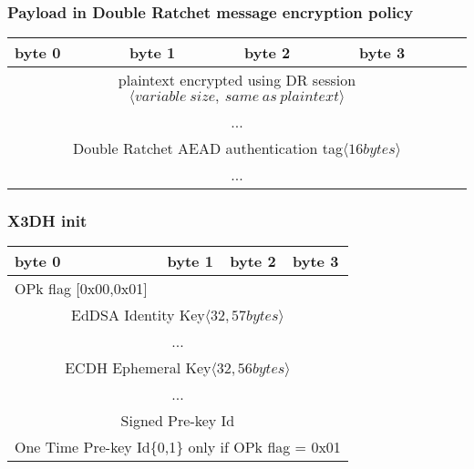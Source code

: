 \documentclass[a4paper,11pt]{article}
\begin{document}
      \subsubsection{Payload in Double Ratchet message encryption policy}
      \begin{center}
      \begin{tabular}{ | p{1.4in} | p{1.4in} | p{1.4in} | p{1.4in} |}
        \hline
        \cellcolor[gray]{0.85} byte 0 & \cellcolor[gray]{0.85} byte 1 & \cellcolor[gray]{0.85} byte 2 & \cellcolor[gray]{0.85}byte 3\\
        \hline
        \multicolumn{4}{|c|}{plaintext encrypted using DR session$\langle variable\ size,\ same\ as\ plaintext\rangle $}\\
        \multicolumn{4}{|c|}{...}\\
        \hline
        \multicolumn{4}{|c|}{Double Ratchet AEAD authentication tag$\langle 16bytes\rangle $}\\
        \multicolumn{4}{|c|}{...}\\
        \hline
      \end{tabular}
      \end{center}

      \subsubsection{X3DH init}
      \begin{center}
      \begin{tabular}{ | p{1.4in} | p{1.4in} | p{1.4in} | p{1.4in} |}
        \hline
        \cellcolor[gray]{0.85} byte 0 & \cellcolor[gray]{0.85} byte 1 & \cellcolor[gray]{0.85} byte 2 & \cellcolor[gray]{0.85}byte 3\\
        \hline
        OPk flag [0x00,0x01]&\multicolumn{3}{|c|}{}\\
        \cline{1-1}
        \multicolumn{4}{|c|}{EdDSA Identity Key$\langle 32,57bytes\rangle $}\\
        \multicolumn{4}{|c|}{...}\\
        \hline
        \multicolumn{4}{|c|}{ ECDH Ephemeral Key$\langle 32,56bytes\rangle $}\\
        \multicolumn{4}{|c|}{...}\\
        \hline
        \multicolumn{4}{|c|}{Signed Pre-key Id}\\
        \hline
        \multicolumn{4}{|c|}{One Time Pre-key Id\{0,1\} only if OPk flag = 0x01}\\
        \hline
      \end{tabular}
      \end{center}
      
\end{document}

